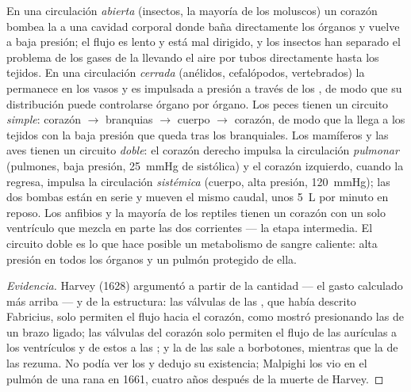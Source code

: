 \begin{definition}\label{def:b2:blood-circulation:circuits}
En una circulación \emph{abierta} (insectos, la mayoría de los moluscos)
un corazón bombea la  a una cavidad corporal donde baña
directamente los órganos y vuelve a baja presión; el flujo es lento y
está mal dirigido, y los insectos han separado el problema de los gases de
la  llevando el aire por tubos directamente hasta los tejidos. En
una circulación \emph{cerrada} (anélidos, cefalópodos, vertebrados) la
 permanece en los vasos y es impulsada a presión a través de los
, de modo que su distribución puede controlarse órgano por
órgano. Los peces tienen un circuito \emph{simple}: corazón
$\to$ branquias $\to$ cuerpo $\to$ corazón, de modo que la  llega a
los tejidos con la baja presión que queda tras los  branquiales.
Los mamíferos y las aves tienen un circuito \emph{doble}: el corazón
derecho impulsa la circulación \emph{pulmonar} (pulmones, baja presión,
\qty{25}{mmHg} de sistólica) y el corazón izquierdo, cuando la 
regresa, impulsa la circulación \emph{sistémica} (cuerpo, alta presión,
\qty{120}{mmHg}); las dos bombas están en serie y mueven el mismo caudal,
unos \qty{5}{L} por minuto en reposo. Los anfibios y la mayoría de los
reptiles tienen un corazón con un solo ventrículo que mezcla en parte las
dos corrientes --- la etapa intermedia. El circuito doble es lo que hace
posible un metabolismo de sangre caliente: alta presión en todos los
órganos y un pulmón protegido de ella.
\end{definition}
\begin{proof}[Evidencia]
Harvey (1628) argumentó a partir de la cantidad --- el gasto calculado
más arriba --- y de la estructura: las válvulas de las , que había
descrito Fabricius, solo permiten el flujo hacia el corazón, como mostró
presionando las  de un brazo ligado; las válvulas del corazón solo
permiten el flujo de las aurículas a los ventrículos y de estos a las
; y la  de las  sale a borbotones, mientras que la
de las  rezuma. No podía ver los  y dedujo su existencia;
Malpighi los vio en el pulmón de una rana en 1661, cuatro años después de
la muerte de Harvey.
\end{proof}

